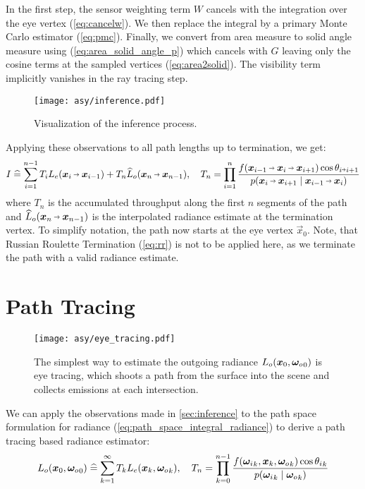 In the first step, the sensor weighting term $W$ cancels with the integration over the eye vertex (\ref{eq:cancelw}).
We then replace the integral by a primary Monte Carlo estimator (\ref{eq:pmc}).
Finally, we convert from area measure to solid angle measure using (\autoref{eq:area_solid_angle_p}) which cancels with $G$ leaving only the cosine terms at the sampled vertices (\ref{eq:area2solid}).
The visibility term implicitly vanishes in the ray tracing step.
\begin{figure}[ht]
    \centering
    \texttt{[image: asy/inference.pdf]}
\caption{Visualization of the inference process.}
\label{fig:inference}
\end{figure}

Applying these observations to all path lengths up to termination, we get:
\begin{equation}
\label{eq:inference}
    I
    \hateq \sum_{i=1}^{n-1} T_i L_e(\pdir{i}{i-1}) + T_n \widehat{L}_o(\pdir{n}{n-1}), \quad
    T_n
    = \prod_{i=1}^{n} \frac{f(\ptrip{i-1}{i}{i+1}) \cos \theta_{i \veryshortarrow i+1}}{p(\pdir{i}{i+1} \mid \pdir{i-1}{i})}
\end{equation}
where $T_n$ is the accumulated throughput along the first $n$ segments of the path and $\widehat{L}_o(\pdir{n}{n-1})$ is the interpolated radiance estimate at the termination vertex.
To simplify notation, the path now starts at the eye vertex $\vec{x}_0$.
Note, that Russian Roulette Termination (\autoref{eq:rr}) is not to be applied here, as we terminate the path with a valid radiance estimate.

\section{Path Tracing}
\label{sec:re_eye}
\begin{figure}[ht]
    \centering
    \texttt{[image: asy/eye\_tracing.pdf]}
\caption{The simplest way to estimate the outgoing radiance $L_o(\bm{x}_0, {\bm{\omega}_o}_0)$ is eye tracing, which shoots a path from the surface into the scene and collects emissions at each intersection.}
\label{fig:eye_tracing}
\end{figure}
We can apply the observations made in \autoref{sec:inference} to the path space formulation for radiance (\autoref{eq:path_space_integral_radiance}) to derive a path tracing based radiance estimator:
\begin{equation}
    L_o(\bm{x}_0, {\bm{\omega}_o}_0)
    \mathrel{\widehat{=}} \sum_{k=1}^{\infty} T_k L_e(\bm{x}_k, {\bm{\omega}_o}_k), \quad
    T_n
    = \prod_{k=0}^{n-1} \frac{f({\bm{\omega}_i}_k, \bm{x}_k, {\bm{\omega}_o}_k) \cos {\theta_i}_k}{p({\bm{\omega}_i}_k \mid {\bm{\omega}_o}_k)}
\end{equation}

